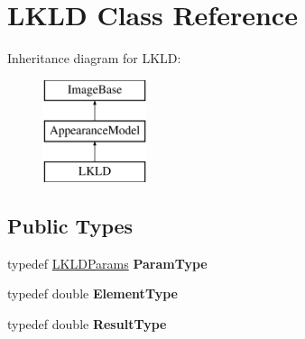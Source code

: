 \hypertarget{classLKLD}{\section{L\-K\-L\-D Class Reference}
\label{classLKLD}
}
Inheritance diagram for L\-K\-L\-D\-:\begin{figure}[H]
\begin{center}
\leavevmode
\includegraphics[height=3.000000cm]{classLKLD}
\end{center}
\end{figure}
\subsection*{Public Types}
\begin{DoxyCompactItemize}
\item 
\hypertarget{classLKLD_a3d1caff7a007080ed2ecb77d71b49e4f}{typedef \hyperlink{structLKLDParams}{L\-K\-L\-D\-Params} {\bfseries Param\-Type}}\label{classLKLD_a3d1caff7a007080ed2ecb77d71b49e4f}

\item 
\hypertarget{classLKLD_ade42d73fe98f03aec3bf927dfc0b7ff5}{typedef double {\bfseries Element\-Type}}\label{classLKLD_ade42d73fe98f03aec3bf927dfc0b7ff5}

\item 
\hypertarget{classLKLD_a940bc5ea2864de2494fe3ab5a6079a8c}{typedef double {\bfseries Result\-Type}}\label{classLKLD_a940bc5ea2864de2494fe3ab5a6079a8c}

\end{DoxyCompactItemize}

